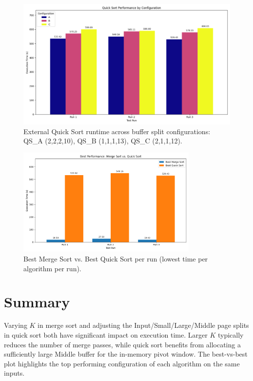 \documentclass{article}
\begin{document}
\begin{figure}[h!]
\centering
\includegraphics[width=\textwidth]{figures/quick_sort_time.png}
\caption{External Quick Sort runtime across buffer split configurations: QS\_A (2,2,2,10), QS\_B (1,1,1,13), QS\_C (2,1,1,12).}
\label{fig:quick_sort_config_comparison}
\end{figure}

\begin{figure}[h!]
\centering
\includegraphics[width=0.8\textwidth]{figures/best_vs_best.png}
\caption{Best Merge Sort vs. Best Quick Sort per run (lowest time per algorithm per run).}
\label{fig:best_vs_best}
\end{figure}

\section*{Summary}
Varying $K$ in merge sort and adjusting the Input/Small/Large/Middle page splits in quick sort both have significant impact on execution time. Larger $K$ typically reduces the number of merge passes, while quick sort benefits from allocating a sufficiently large Middle buffer for the in-memory pivot window. The best-vs-best plot highlights the top performing configuration of each algorithm on the same inputs.
\end{document}
